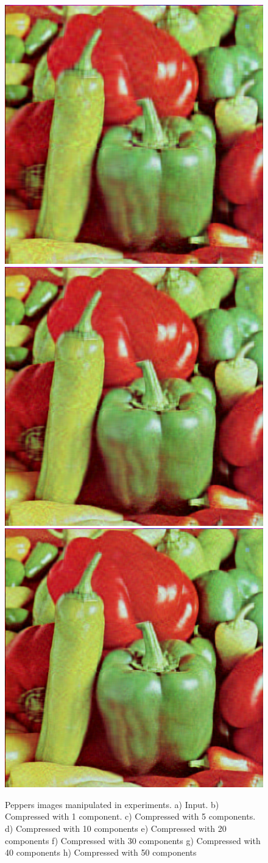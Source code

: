 \documentclass[]{IEEEtran}
\begin{document}
\begin{figure}[h]
  \includegraphics[width=0.4\hsize]{../output/peppers_30.png}
  \includegraphics[width=0.4\hsize]{../output/peppers_40.png}
  \includegraphics[width=0.4\hsize]{../output/peppers_50.png}
  \caption{Peppers images manipulated in experiments. a) Input. b) Compressed with 1 component. c) Compressed with 5 components. d) Compressed with 10 components e) Compressed with 20 components f) Compressed with 30 components g) Compressed with 40 components h) Compressed with 50 components}
  \label{fig:effect-peppers}
\end{figure}
\end{document}
